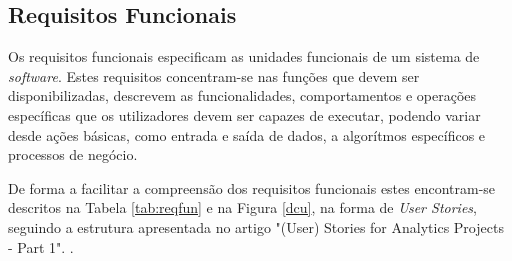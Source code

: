 \subsection{Requisitos Funcionais}
\label{sec:3-rf}

Os requisitos funcionais especificam as unidades funcionais de um sistema de \textit{software}.
Estes requisitos concentram-se nas funções que devem ser disponibilizadas, descrevem as
funcionalidades, comportamentos e operações específicas que os utilizadores devem ser capazes de 
executar, podendo variar desde ações básicas, como entrada e saída de dados, a algorítmos 
específicos e processos de negócio.

De forma a facilitar a compreensão dos requisitos funcionais estes encontram-se descritos na 
Tabela \ref{tab:reqfun} e na Figura \ref{dcu}, na forma de \textit{User Stories}, seguindo a 
estrutura apresentada no artigo "(User) Stories for Analytics Projects - Part 1". \cite{us}.

